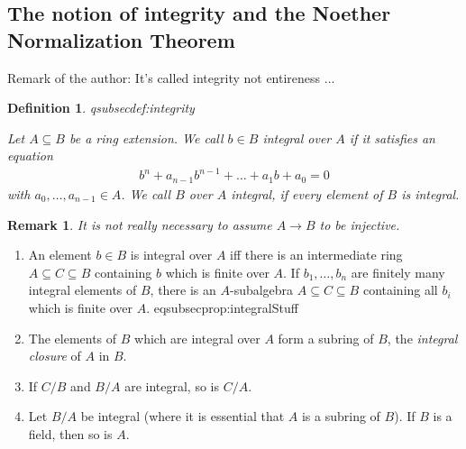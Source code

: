 \documentclass[DIV=14,parskip=full,pointednumbers]{scrartcl}
\newenvironment{rmnumerate}{\begin{enumerate}[label={\upshape(\roman*)},ref=\curthm]}{\end{enumerate}}
\theoremstyle{cthm}
\theoremstyle{cvarthm}
\theoremstyle{cdef}
\newtheorem{defi}{Definition}[subsection]
\newtheorem{rem}{Remark}[subsection]
\newcommand{\lbl}[1]{
	\label{#1}
	\ifmmode
	\expandafter\xdef\csname eqsubsec#1\endcsname{\thesubsection}
	\fi
}
\newcommand{\ldotspam}{,\ldots,}
\begin{document}
	\subsection{The notion of integrity and the Noether Normalization Theorem}
	Remark of the author: It's called integrity not entireness ...
	\begin{defi}\lbl{def:integrity}
		Let $A\subseteq B$ be a ring extension. We call $b\in B$ \emph{integral} over $A$ if it satisfies an equation
		\begin{align*}
		b^n +a_{n-1}b^{n-1}+\ldots+a_1b+a_0 =0
		\end{align*}
		with $a_0,\ldots,a_{n-1}\in A$. We call $B$ over $A$ \emph{integral}, if every element of $B$ is integral.
	\end{defi}
	\begin{rem}
		It is not really necessary to assume $A\to B$ to be injective.
	\end{rem}
	\begin{prop}
		\begin{rmnumerate}\relax
			\item An element $b\in B$ is integral over $A$ iff there is an intermediate ring $A\subseteq C\subseteq B$ containing $b$ which is finite over $A$. If $b_1\ldotspam b_n$ are finitely many integral elements of $B$, there is an $A$-subalgebra $A\subseteq C\subseteq B$ containing all $b_i$ which is finite over $A$.\lbl{prop:integralStuff}%
			\item The elements of $B$ which are integral over $A$ form a subring of $B$, the \emph{integral closure} of $A$ in $B$.
			\item If $C/B$ and $B/A$ are integral, so is $C/A$.
			\item Let $B/A$ be integral (where it is essential that $A$ is a subring of $B$). If $B$ is a field, then so is $A$.
		\end{rmnumerate}
		
	\end{prop}
	
\end{document}
